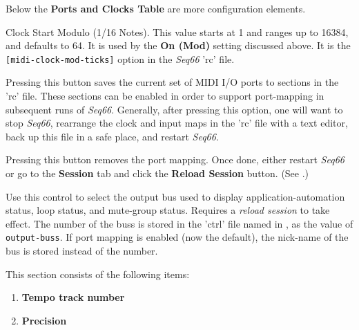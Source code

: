    Below the \textbf{Ports and Clocks Table} are more configuration elements.

   \setcounter{ItemCounter}{0}      %

   Clock Start Modulo (1/16 Notes).
   This value starts at 1 and ranges up to 16384, and defaults to 64.
   It is used by the \textbf{On (Mod)} setting discussed above.
   It is the \texttt{[midi-clock-mod-ticks]} option in the \textsl{Seq66}
   'rc' file.

   Pressing this button saves the current set of MIDI I/O ports to sections in
   the 'rc' file.  These sections can be enabled in order to support
   port-mapping in subsequent runs of \textsl{Seq66}.
   Generally, after pressing this option, one will want to stop
   \textsl{Seq66}, rearrange the clock and input maps in the
   'rc' file with a text editor, back up this file in a safe place,
   and restart \textsl{Seq66}.

   Pressing this button removes the port mapping.
   Once done, either restart \textsl{Seq66} or go to the \textbf{Session}
   tab and click the \textbf{Reload Session} button.
   (See .)

   Use this control to select the output bus used to display
   application-automation status, loop status, and mute-group status.
   Requires a \textsl{reload session} to take effect.
   The number of the buss is stored in the 'ctrl' file named in
   ,
   as the value of \texttt{output-buss}.
   If port mapping is enabled (now the default),
   the nick-name of the bus is stored instead of the number.

   This section consists of the following items:

   \begin{enumerate}
      \item \textbf{Tempo track number}
      \item \textbf{Precision}
   \end{enumerate}

